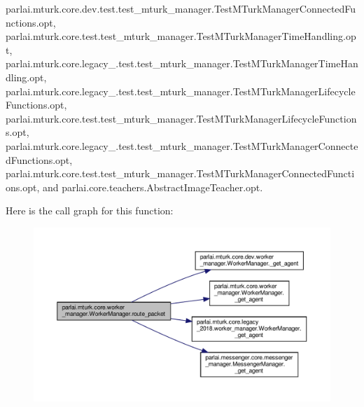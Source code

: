 parlai.\+mturk.\+core.\+dev.\+test.\+test\+\_\+mturk\+\_\+manager.\+Test\+M\+Turk\+Manager\+Connected\+Functions.\+opt, parlai.\+mturk.\+core.\+test.\+test\+\_\+mturk\+\_\+manager.\+Test\+M\+Turk\+Manager\+Time\+Handling.\+opt, parlai.\+mturk.\+core.\+legacy\+\_.\+test.\+test\+\_\+mturk\+\_\+manager.\+Test\+M\+Turk\+Manager\+Time\+Handling.\+opt, parlai.\+mturk.\+core.\+legacy\+\_.\+test.\+test\+\_\+mturk\+\_\+manager.\+Test\+M\+Turk\+Manager\+Lifecycle\+Functions.\+opt, parlai.\+mturk.\+core.\+test.\+test\+\_\+mturk\+\_\+manager.\+Test\+M\+Turk\+Manager\+Lifecycle\+Functions.\+opt, parlai.\+mturk.\+core.\+legacy\+\_.\+test.\+test\+\_\+mturk\+\_\+manager.\+Test\+M\+Turk\+Manager\+Connected\+Functions.\+opt, parlai.\+mturk.\+core.\+test.\+test\+\_\+mturk\+\_\+manager.\+Test\+M\+Turk\+Manager\+Connected\+Functions.\+opt, and parlai.\+core.\+teachers.\+Abstract\+Image\+Teacher.\+opt.

Here is the call graph for this function\+:
\nopagebreak
\begin{figure}[H]
\begin{center}
\leavevmode
\includegraphics[width=350pt]{classparlai_1_1mturk_1_1core_1_1worker__manager_1_1WorkerManager_a829bf9d74d9afb0277c11347745ac6db_cgraph}
\end{center}
\end{figure}
\mbox{\label{classparlai_1_1mturk_1_1core_1_1worker__manager_1_1WorkerManager_ad5ea6d1d764743de25c71d027d6f981c}} 
